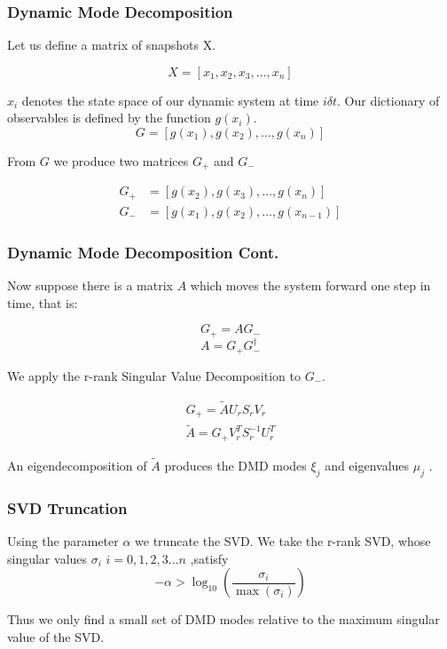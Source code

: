 \documentclass{beamer}
\begin{document}


\begin{frame}
    \frametitle{Dynamic Mode Decomposition}
    Let us define a matrix of snapshots X. 

    $$
    X = [x_1, x_2, x_3,\dots, x_n]
    $$
    
    $x_i$ denotes the state space of our dynamic system at time $i \delta t$. Our dictionary of observables is defined by the function $g(x_i)$. 
    $$
    G = [g(x_1), g(x_2), \dots, g(x_n)]
    $$

    From $G$ we produce two matrices $G_{+}$ and $G_{-}$

    \begin{align*}
        G_{+} &= [g(x_2), g(x_3), \dots, g(x_n)]\\
      G_{-} &= [g(x_1), g(x_2), \dots, g(x_{n-1})] 
    \end{align*}
\end{frame}

\begin{frame}
    \frametitle{Dynamic Mode Decomposition Cont.}
    Now suppose there is a matrix $A$ which moves the system forward one step in time, that is:

    $$
    G_{+} = AG_{-}
    $$
    $$
    A = G_{+}G^{\dagger}_{-}
    $$

    We apply the r-rank Singular Value Decomposition to $G_{-}$.

    \begin{align*}
        G_{+} = {\tilde A}U_r S_r V_r \\
        {\tilde A} = G_{+}V^{T}_r S^{-1}_r U^{T}_r
    \end{align*}

    An eigendecomposition of ${\tilde A}$ produces the DMD modes $\xi_j$ and eigenvalues $\mu_j$ \cite{doi:10.1137/1.9781611974508}.
\end{frame}
\begin{frame}
    \frametitle{SVD Truncation}
     Using the parameter $\alpha$
    we truncate the SVD. We take the r-rank SVD, whose singular values $\sigma_i$ $i=0,1,2,3\dots n$ ,satisfy
    $$
    -\alpha > \log_{10} \left(\frac{\sigma_i}{\max(\sigma_i)}\right)
    $$

    Thus we only find a small set of DMD modes relative to the maximum singular value of the SVD. 
\end{frame}
\end{document}
